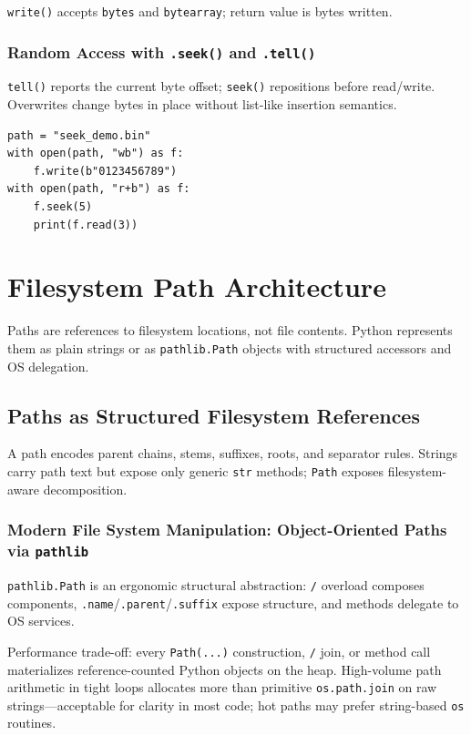 \documentclass[a4paper,twoside]{report}
\begin{document}
\texttt{write()} accepts \texttt{bytes} and \texttt{bytearray}; return value is bytes written.

\subsubsection{Random Access with \texttt{.seek()} and \texttt{.tell()}}

\texttt{tell()} reports the current byte offset; \texttt{seek()} repositions before read/write. Overwrites change bytes in place without list-like insertion semantics.

\begin{verbatim}
path = "seek_demo.bin"
with open(path, "wb") as f:
    f.write(b"0123456789")
with open(path, "r+b") as f:
    f.seek(5)
    print(f.read(3))
\end{verbatim}


\section{Filesystem Path Architecture}

Paths are references to filesystem locations, not file contents. Python represents them as plain strings or as \texttt{pathlib.Path} objects with structured accessors and OS delegation.


\subsection{Paths as Structured Filesystem References}

A path encodes parent chains, stems, suffixes, roots, and separator rules. Strings carry path text but expose only generic \texttt{str} methods; \texttt{Path} exposes filesystem-aware decomposition.

\subsubsection{Modern File System Manipulation: Object-Oriented Paths via \texttt{pathlib}}

\texttt{pathlib.Path} is an ergonomic structural abstraction: \texttt{/} overload composes components, \texttt{.name}/\texttt{.parent}/\texttt{.suffix} expose structure, and methods delegate to OS services.

Performance trade-off: every \texttt{Path(...)} construction, \texttt{/} join, or method call materializes reference-counted Python objects on the heap. High-volume path arithmetic in tight loops allocates more than primitive \texttt{os.path.join} on raw strings---acceptable for clarity in most code; hot paths may prefer string-based \texttt{os} routines.
\end{document}
